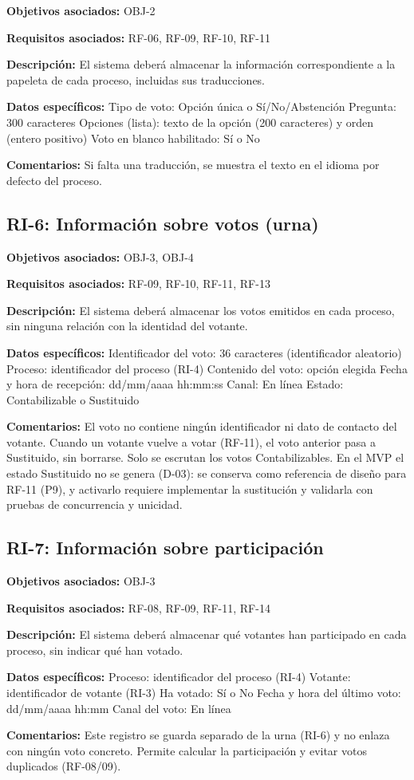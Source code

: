 \textbf{Objetivos asociados:} OBJ-2\par
\textbf{Requisitos asociados:} RF-06, RF-09, RF-10, RF-11\par
\textbf{Descripción:} El sistema deberá almacenar la información correspondiente a la papeleta de cada proceso, incluidas sus traducciones.\par
\textbf{Datos específicos:} Tipo de voto: Opción única o Sí/No/Abstención Pregunta: 300 caracteres Opciones (lista): texto de la opción (200 caracteres) y orden (entero positivo) Voto en blanco habilitado: Sí o No\par
\textbf{Comentarios:} Si falta una traducción, se muestra el texto en el idioma por defecto del proceso.\par

\subsection{RI-6: Información sobre votos (urna)}

\textbf{Objetivos asociados:} OBJ-3, OBJ-4\par
\textbf{Requisitos asociados:} RF-09, RF-10, RF-11, RF-13\par
\textbf{Descripción:} El sistema deberá almacenar los votos emitidos en cada proceso, sin ninguna relación con la identidad del votante.\par
\textbf{Datos específicos:} Identificador del voto: 36 caracteres (identificador aleatorio) Proceso: identificador del proceso (RI-4) Contenido del voto: opción elegida Fecha y hora de recepción: dd/mm/aaaa hh:mm:ss Canal: En línea Estado: Contabilizable o Sustituido\par
\textbf{Comentarios:} El voto no contiene ningún identificador ni dato de contacto del votante. Cuando un votante vuelve a votar (RF-11), el voto anterior pasa a Sustituido, sin borrarse. Solo se escrutan los votos Contabilizables. En el MVP el estado Sustituido no se genera (D-03): se conserva como referencia de diseño para RF-11 (P9), y activarlo requiere implementar la sustitución y validarla con pruebas de concurrencia y unicidad.\par

\subsection{RI-7: Información sobre participación}

\textbf{Objetivos asociados:} OBJ-3\par
\textbf{Requisitos asociados:} RF-08, RF-09, RF-11, RF-14\par
\textbf{Descripción:} El sistema deberá almacenar qué votantes han participado en cada proceso, sin indicar qué han votado.\par
\textbf{Datos específicos:} Proceso: identificador del proceso (RI-4) Votante: identificador de votante (RI-3) Ha votado: Sí o No Fecha y hora del último voto: dd/mm/aaaa hh:mm Canal del voto: En línea\par
\textbf{Comentarios:} Este registro se guarda separado de la urna (RI-6) y no enlaza con ningún voto concreto. Permite calcular la participación y evitar votos duplicados (RF-08/09).\par

